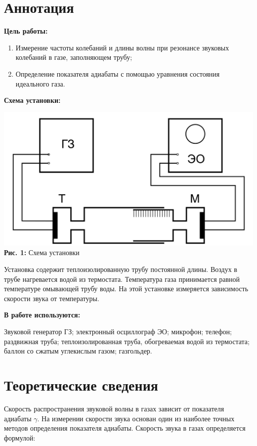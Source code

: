 \documentclass[12pt,a4paper]{scrartcl}
\begin{document}
	\section{Аннотация}
	
	\textbf{Цель работы: }
	
	\begin{enumerate}
		\item Измерение частоты колебаний и длины волны при
		резонансе звуковых колебаний в газе, заполняющем трубу;
		\item Определение показателя адиабаты с помощью уравнения состояния идеального газа.
	\end{enumerate}
	
	\textbf{Схема установки:}
	\begin{center}
		\includegraphics[scale=0.25]{PIC_1}
		\\\textbf{Рис. 1:} Схема установки
	\end{center}
		
	Установка содержит теплоизолированную трубу постоянной длины. Воздух в трубе нагревается водой из термостата. Температура газа принимается равной температуре омывающей трубу воды. На этой установке измеряется зависимость скорости звука от температуры.	
		
	\textbf{В работе используются:}
	
	Звуковой генератор ГЗ; электронный осциллограф ЭО; микрофон; телефон; раздвижная труба; теплоизолированная труба, обогреваемая водой из термостата; баллон со сжатым углекислым газом; газгольдер.
	
	\section{Теоретические сведения}
	Скорость распространения звуковой волны в газах зависит от показателя адиабаты $\gamma$. На измерении скорости звука основан один из наиболее точных методов определения показателя адиабаты. Скорость звука в газах определяется формулой:
	
\end{document}
